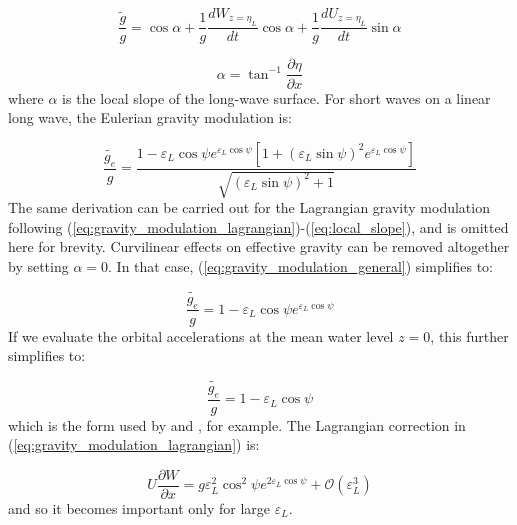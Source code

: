 \documentclass[lineno]{jfm}
\begin{document}
\begin{equation}
\label{eq:gravity_modulation_general}
\frac{\widetilde{g}}{g}
  = \cos{\alpha} 
  + \frac{1}{g} \dfrac{dW_{z=\eta_L}}{dt} \cos{\alpha}
  + \frac{1}{g} \dfrac{dU_{z=\eta_L}}{dt} \sin{\alpha}
\end{equation}

\begin{equation}
\label{eq:local_slope}
\alpha = \tan^{-1}{\dfrac{\partial \eta}{\partial x}}
\end{equation}
where $\alpha$ is the local slope of the long-wave surface.
For short waves on a linear long wave, the Eulerian gravity modulation is:

\begin{equation}
\label{eq:gravity_modulation_linear}
\frac{\widetilde{g_e}}{g}
  = 
  \frac{
    1 - \varepsilon_L \cos{\psi} e^{\varepsilon_L \cos{\psi}}
    \left[ 1 + \left(\varepsilon_L \sin{\psi}\right)^2 e^{\varepsilon_L \cos{\psi}} \right]
  }
  {\sqrt{\left(\varepsilon_L \sin{\psi}\right)^2 + 1}}
\end{equation}
The same derivation can be carried out for the Lagrangian gravity
modulation following (\ref{eq:gravity_modulation_lagrangian})-(\ref{eq:local_slope}),
and is omitted here for brevity.
Curvilinear effects on effective gravity can be removed altogether by setting
$\alpha = 0$.
In that case, (\ref{eq:gravity_modulation_general}) simplifies to:

\begin{equation}
\label{eq:gravity_modulation_linear_no_curvature}
\frac{\widetilde{g_e}}{g} = 1 - \varepsilon_L \cos{\psi} e^{\varepsilon_L \cos{\psi}}
\end{equation}
If we evaluate the orbital accelerations at the mean water level $z=0$,
this further simplifies to:

\begin{equation}
\label{eq:gravity_modulation_linear_no_curvature_mean_level}
\frac{\widetilde{g_e}}{g} = 1 - \varepsilon_L \cos{\psi}
\end{equation}
which is the form used by \citet{longuet1960changes} and
\citet{peureux2021unsteady}, for example.
The Lagrangian correction in (\ref{eq:gravity_modulation_lagrangian}) is:

\begin{equation}
\label{eq:gravity_modulation_lagrangian_correction}
U \frac{\partial W}{\partial x} = g \varepsilon_L^2 \cos^2{\psi} e^{2 \varepsilon_L \cos{\psi}}
+ \mathcal{O}(\varepsilon_L^3)
\end{equation}
and so it becomes important only for large $\varepsilon_L$.
\end{document}
